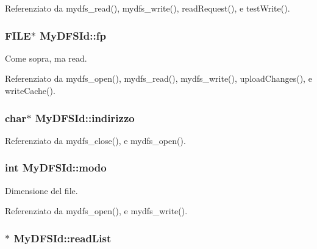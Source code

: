 Referenziato da mydfs\+\_\+read(), mydfs\+\_\+write(), read\+Request(), e test\+Write().

\hypertarget{structMyDFSId_ae2badd91d3b506420a9e49554df8212d}{
\subsubsection[{fp}]{\setlength{\rightskip}{0pt plus 5cm}F\+I\+L\+E$\ast$ My\+D\+F\+S\+Id\+::fp}}\label{structMyDFSId_ae2badd91d3b506420a9e49554df8212d}


Come sopra, ma read. 



Referenziato da mydfs\+\_\+open(), mydfs\+\_\+read(), mydfs\+\_\+write(), upload\+Changes(), e write\+Cache().

\hypertarget{structMyDFSId_ac8c10a1a5b18776bf5e5585ee9e26331}{
\subsubsection[{indirizzo}]{\setlength{\rightskip}{0pt plus 5cm}char$\ast$ My\+D\+F\+S\+Id\+::indirizzo}}\label{structMyDFSId_ac8c10a1a5b18776bf5e5585ee9e26331}


Referenziato da mydfs\+\_\+close(), e mydfs\+\_\+open().

\hypertarget{structMyDFSId_a98bc5ce1a7734459d8b81c997da4e9f0}{
\subsubsection[{modo}]{\setlength{\rightskip}{0pt plus 5cm}int My\+D\+F\+S\+Id\+::modo}}\label{structMyDFSId_a98bc5ce1a7734459d8b81c997da4e9f0}


Dimensione del file. 



Referenziato da mydfs\+\_\+open(), e mydfs\+\_\+write().

\hypertarget{structMyDFSId_a8a4360512d45c22b6d8e980967c7dd32}{
\subsubsection[{read\+List}]{$\ast$ My\+D\+F\+S\+Id\+::read\+List}}\label{structMyDFSId_a8a4360512d45c22b6d8e980967c7dd32}


